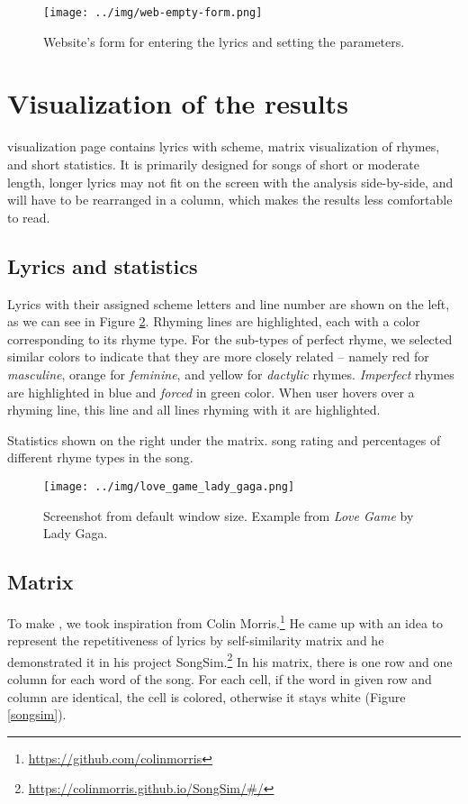 \begin{figure}[h]\centering
	\texttt{[image: ../img/web-empty-form.png]}
	\caption{Website's form for entering the lyrics and setting the parameters.}
	\label{web-form}
\end{figure}

\section{Visualization of the results}
 visualization page contains lyrics with scheme, matrix visualization of rhymes, and short statistics. It is primarily designed for songs of short or moderate length, longer lyrics may not fit on the screen with the analysis side-by-side, and will have to be rearranged in a column, which makes the results less comfortable to read.

\subsection{Lyrics and statistics}\label{sec-lyrics_and_stats}
Lyrics with their assigned scheme letters and line number are shown on the left, as we can see in Figure \ref{web-analysis_window5}. Rhyming lines are highlighted, each with a color corresponding to its rhyme type. For the sub-types of perfect rhyme, we selected similar colors to indicate that they are more closely related -- namely red for \textit{masculine}, orange for \textit{feminine}, and yellow for \textit{dactylic} rhymes. \textit{Imperfect} rhymes are highlighted in blue and \textit{forced} in green color. When  user hovers over a rhyming line, this line and all lines rhyming with it are highlighted.

Statistics  shown on the right under the matrix.  song rating and percentages of different rhyme types in the song.

\begin{figure}[h]\centering
	\texttt{[image: ../img/love\_game\_lady\_gaga.png]}
	\caption[Screenshot from an analysis with the default window size.]{Screenshot from  default window size. Example from \textit{Love Game} by Lady Gaga.}
	\label{web-analysis_window5}
\end{figure}

\subsection{Matrix}\label{visualization-matrix}
To make , we took inspiration from Colin Morris.\footnote{\url{https://github.com/colinmorris}} He came up with an idea to represent the repetitiveness of lyrics by self-similarity matrix and he demonstrated it in his project SongSim.\footnote{\url{https://colinmorris.github.io/SongSim/\#/}} In his matrix, there is one row and one column for each word of the song. For each cell, if the word in given row and column are identical, the cell is colored, otherwise it stays white (Figure \ref{songsim}).

